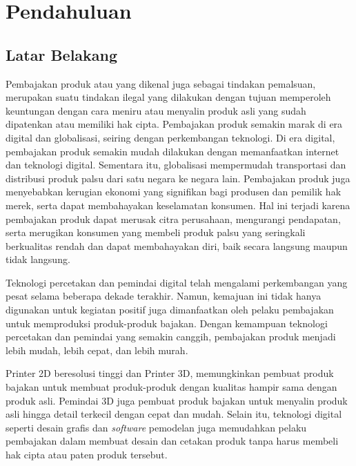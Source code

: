 \chapter{Pendahuluan}

\section{Latar Belakang}
Pembajakan produk atau yang dikenal juga sebagai tindakan pemalsuan, merupakan suatu tindakan ilegal yang dilakukan dengan tujuan memperoleh keuntungan dengan
cara meniru atau menyalin produk asli yang sudah dipatenkan atau memiliki hak cipta. Pembajakan produk semakin marak di era digital dan globalisasi, seiring
dengan perkembangan teknologi. Di era digital, pembajakan produk semakin mudah dilakukan dengan memanfaatkan internet dan teknologi digital. Sementara itu,
globalisasi mempermudah transportasi dan distribusi produk palsu dari satu negara ke negara lain. Pembajakan produk juga menyebabkan kerugian ekonomi yang
signifikan bagi produsen dan pemilik hak merek, serta dapat membahayakan keselamatan konsumen. Hal ini terjadi karena pembajakan produk dapat merusak citra
perusahaan, mengurangi pendapatan, serta merugikan konsumen yang membeli produk palsu yang seringkali berkualitas rendah dan dapat membahayakan diri, baik
secara langsung maupun tidak langsung. \cite{BASCAP2016}

Teknologi percetakan dan pemindai digital telah mengalami perkembangan yang pesat selama beberapa dekade terakhir. Namun, kemajuan ini tidak hanya digunakan
untuk kegiatan positif juga dimanfaatkan oleh pelaku pembajakan untuk memproduksi produk-produk bajakan. Dengan kemampuan teknologi percetakan dan pemindai
yang semakin canggih, pembajakan produk menjadi lebih mudah, lebih cepat, dan lebih murah. \cite{HILL2007DIGITAL}

Printer 2D beresolusi tinggi dan Printer 3D, memungkinkan pembuat produk bajakan untuk membuat produk-produk dengan kualitas hampir sama dengan produk asli.
Pemindai 3D juga pembuat produk bajakan untuk menyalin produk asli hingga detail terkecil dengan cepat dan mudah. Selain itu, teknologi digital seperti desain
grafis dan \emph{software} pemodelan juga memudahkan pelaku pembajakan dalam membuat desain dan cetakan produk tanpa harus membeli hak cipta atau paten produk
tersebut. \cite{DEPOORTER2013INTELECTUAL}

